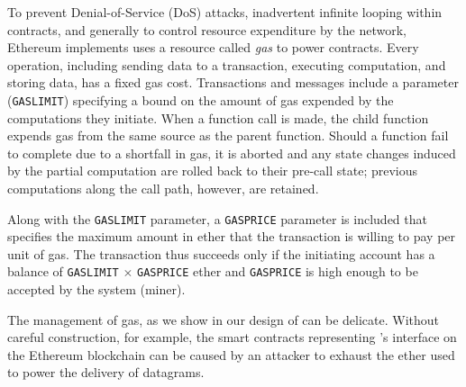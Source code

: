 To prevent Denial-of-Service (DoS) attacks, inadvertent infinite looping within contracts, and generally to control resource expenditure by the network,
Ethereum implements uses a resource called \emph{gas} to power contracts.
Every operation, including sending data to a transaction, executing computation, and storing data, has a fixed gas cost.
Transactions and messages include a parameter (\texttt{GASLIMIT}) specifying a bound on the amount of gas expended by the computations they initiate.
When a function call is made, the child function expends gas from the same source as the parent function.
Should a function fail to complete due to a shortfall in gas,
it is aborted and any state changes induced by the partial computation are rolled back to their pre-call state;
previous computations along the call path, however, are retained.

Along with the \texttt{GASLIMIT} parameter, a \texttt{GASPRICE} parameter is included that specifies the maximum amount in ether that the transaction is willing to pay per unit of gas. The transaction thus succeeds only if the initiating account has a balance of \texttt{GASLIMIT} $\times$ \texttt{GASPRICE} ether and \texttt{GASPRICE} is high enough to be accepted by the system (miner). 

The management of gas, as we show in our design of \tcs can be delicate. Without careful construction, for example, the smart contracts representing \tc's interface on the Ethereum blockchain can be caused by an attacker to exhaust the ether used to power the delivery of datagrams. 




